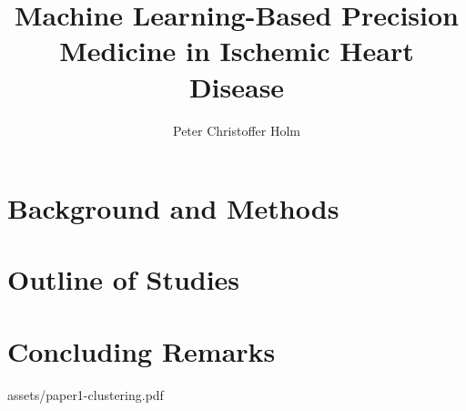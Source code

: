 \documentclass[a4paper, twoside, nobib]{tufte-book}
\title[ML-based precision medicine in ischemic heart disease]{%
    Machine Learning-Based Precision Medicine in Ischemic Heart Disease}
\author[Peter Christoffer Holm]{Peter Christoffer Holm}
\begin{document}
\frontmatter
\kutitlepage
\maketitlepage

  

        
        

\cleardoublepage

\tableofcontents
\listoffigures
\listoftables

      

\cleardoublepage
   

\mainmatter %

\part{Background and Methods}
       
   
  
    

\part{Outline of Studies}
 
 
 

\part{Concluding Remarks}
      
%       

\backmatter %

\printbibliography

\mainmatter %

\appendix
\appendixpage
\addappheadtotoc
\cleardoublepage

%
    {assets/paper1-clustering.pdf}
\end{document}
